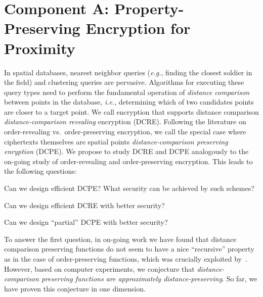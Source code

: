 \section{Component A:  Property-Preserving Encryption for Proximity}

In spatial databases, nearest neighbor queries (\emph{e.g.}, finding the closest soldier in the field) and clustering queries are pervasive.  Algorithms for executing these query types need to perform the fundamental operation of \emph{distance comparison} between points in the database, \emph{i.e.}, determining which of two candidates points are closer to a target point.  We call encryption that supports distance comparison \emph{distance-comparison revealing} encryption (DCRE).  Following the literature on order-revealing vs.~order-preserving encryption, we call the special case where ciphertexts themselves are spatial points \emph{distance-comparison preserving enryption} (DCPE).  We propose to study DCRE and DCPE analogously to the on-going study of order-revealing and order-preserving encryption.  
This leads to the following questions:

\begin{question}
Can we design efficient DCPE?  What security can be achieved by such schemes?
\end{question}


\begin{question}
Can we design efficient DCRE with better security?
\end{question}

\begin{question}
Can we design ``partial'' DCPE with better security?
\end{question}

To answer the first question, in on-going work we have found that distance comparison preserving functions do not seem to have a nice ``recursive'' property as in the case of order-preserving functions, which was crucially exploited by~\cite{EC:BCLO09}.  However, based on computer experiments, we conjecture that \emph{distance-comparison preserving functions are approximately distance-preserving}.    So far, we have proven this conjecture in one dimension.

